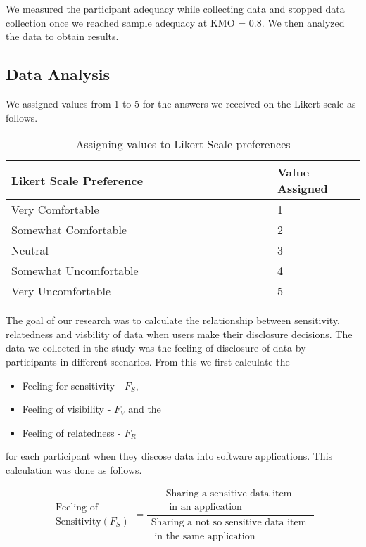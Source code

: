\documentclass[conference]{IEEEtran}
\begin{document}
We measured the participant adequacy while collecting data and stopped data collection once we reached sample adequacy at KMO = 0.8. We then analyzed the data to obtain results.

\subsection {Data Analysis}

We assigned values from 1 to 5 for the answers we received on the Likert scale as follows.

\begin{center}
\begin{table}[htbp]
\caption{Assigning values to Likert Scale preferences}
\begin{center}
\begin{adjustbox}{width=0.5\textwidth}
\begin{tabular}{|p{0.75\linewidth}|p{0.25\linewidth}|}
\hline
Likert Scale Preference & Value Assigned \\
\hline
Very Comfortable & 1\\
\hline
Somewhat Comfortable& 2 \\
\hline
Neutral & 3  \\
\hline
Somewhat Uncomfortable & 4 \\
\hline
Very Uncomfortable & 5 \\
\hline
\end{tabular}
\end{adjustbox}
\end{center}
\end{table}
\end{center}

The goal of our research was to calculate the relationship between sensitivity, relatedness and visbility of data when users make their disclosure decisions. The data we collected in the study was the feeling of disclosure of data by participants in different scenarios. From this we first calculate the
\begin{itemize}
\item Feeling for sensitivity -  $F_S$, 
\item Feeling of visibility - $F_V$ and the 
\item Feeling of relatedness -  $F_R$
\end{itemize}
for each participant when they discose data into software applications. This calculation was done as follows.

\[ \begin{aligned} \text{Feeling of } \\ \text{Sensitivity}(F_{S}) \end{aligned} =
\frac{\begin{aligned}
      \text{Sharing a sensitive data item } \\ \text{ in an application}
      \end{aligned}}%
 {\begin{aligned}
      \text{Sharing a not so sensitive data item }\\ \text{ in the same application}
      \end{aligned}}
\]
\end{document}
